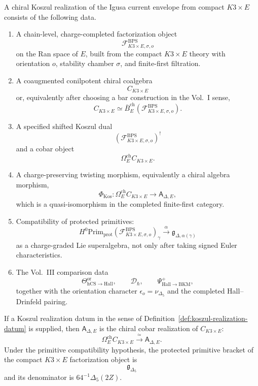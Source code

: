 \begin{definition}
\label{def:koszul-realization-datum}
A chiral Koszul realization of the Igusa current envelope from compact
\(K3\times E\) consists of the following data.
\begin{enumerate}
\item A chain-level, charge-completed factorization object
\[
\mathcal F^{\mathrm{BPS}}_{K3\times E,\sigma,o}
\]
on the Ran space of \(E\), built from the compact \(K3\times E\) theory
with orientation \(o\), stability chamber \(\sigma\), and finite-first
filtration.
\item A coaugmented conilpotent chiral coalgebra
\[
C_{K3\times E}
\]
or, equivalently after choosing a bar construction in the Vol.~I sense,
\[
C_{K3\times E}\simeq
\bar B^{\mathrm{ch}}_E
\left(\mathcal F^{\mathrm{BPS}}_{K3\times E,\sigma,o}\right).
\]
\item A specified shifted Koszul dual
\[
\left(\mathcal F^{\mathrm{BPS}}_{K3\times E,\sigma,o}\right)^!
\]
and a cobar object
\[
\Omega^{\mathrm{ch}}_E C_{K3\times E}.
\]
\item A charge-preserving twisting morphism, equivalently a chiral algebra
morphism,
\[
\Phi_{\mathrm{Kos}}:
\Omega^{\mathrm{ch}}_E C_{K3\times E}
\longrightarrow
\mathsf A_{\Delta,E},
\]
which is a quasi-isomorphism in the completed finite-first category.
\item Compatibility of protected primitives:
\[
H^0\mathrm{Prim}_{\mathrm{prot}}
\left(\mathcal F^{\mathrm{BPS}}_{K3\times E,\sigma,o}\right)_\gamma
\xrightarrow{\ \alpha\ }
\mathfrak g_{\Delta,\alpha(\gamma)}
\]
as a charge-graded Lie superalgebra, not only after taking signed Euler
characteristics.
\item The Vol.~III comparison data
\[
\Theta^{\mathrm{or}}_{\mathrm{hCS}\to\mathrm{Hall}},
\qquad
\mathcal D_\hbar,
\qquad
\Psi^+_{\mathrm{Hall}\to\mathrm{BKM}},
\]
together with the orientation character
\(\epsilon_o=\nu_{\Delta_5}\) and the completed Hall--Drinfeld pairing.
\end{enumerate}
\end{definition}

\begin{theorem}
\label{thm:conditional-koszul}
If a Koszul realization datum in the sense of
Definition~\ref{def:koszul-realization-datum} is supplied, then
\(\mathsf A_{\Delta,E}\) is the chiral cobar realization of
\(C_{K3\times E}\):
$$
\Omega^{\mathrm{ch}}_E C_{K3\times E}
\xrightarrow{\ \simeq\ }
\mathsf A_{\Delta,E}.
$$
Under the primitive compatibility hypothesis, the protected primitive
bracket of the compact \(K3\times E\) factorization object is
\[
\mathfrak g_{\Delta_5}
\]
and its denominator is \(64^{-1}\Delta_5(2Z)\).
\end{theorem}

